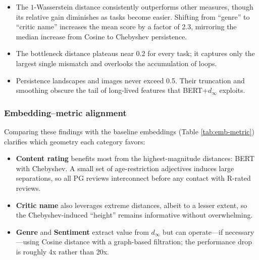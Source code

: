 \documentclass[fleqn,10pt]{SelfArx}
\begin{document}
\begin{itemize}[leftmargin=*]
  \item The $1$-Wasserstein distance consistently outperforms other measures, though its relative gain diminishes as tasks become easier. Shifting from “genre” to “critic name” increases the mean score by a factor of 2.3, mirroring the median increase from Cosine to Chebyshev persistence.
  \item The bottleneck distance plateaus near 0.2 for every task; it captures only the largest single mismatch and overlooks the accumulation of loops.
  \item Persistence landscapes and images never exceed 0.5. Their truncation and smoothing obscure the tail of long-lived features that BERT+$d_{\infty}$ exploits.
\end{itemize}

\subsubsection*{Embedding–metric alignment}
Comparing these findings with the baseline embeddings (Table \ref{tab:emb-metric}) clarifies which geometry each category favors:

\begin{itemize}[leftmargin=*]
  \item \textbf{Content rating} benefits most from the highest-magnitude distances: BERT with Chebyshev. A small set of age-restriction adjectives induces large separations, so all PG reviews interconnect before any contact with R-rated reviews.
  \item \textbf{Critic name} also leverages extreme distances, albeit to a lesser extent, so the Chebyshev-induced “height” remains informative without overwhelming.
  \item \textbf{Genre} and \textbf{Sentiment} extract value from $d_{\infty}$ but can operate—if necessary—using Cosine distance with a graph-based filtration; the performance drop is roughly 4x rather than 20x.
\end{itemize}
\end{document}
